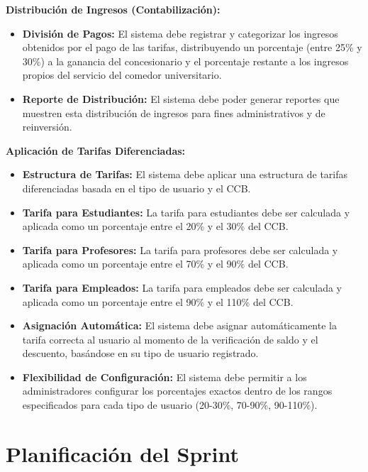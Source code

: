 \documentclass[12pt]{article}
\begin{document}
\textbf{Distribución de Ingresos (Contabilización):}

\begin{itemize}
	\item \textbf{División de Pagos:} El sistema debe registrar y categorizar los ingresos obtenidos por el pago de las tarifas, distribuyendo un porcentaje (entre 25\% y 30\%) a la ganancia del concesionario y el porcentaje restante a los ingresos propios del servicio del comedor universitario.
	\item \textbf{Reporte de Distribución:} El sistema debe poder generar reportes que muestren esta distribución de ingresos para fines administrativos y de reinversión.
\end{itemize}

\pagebreak

\textbf{Aplicación de Tarifas Diferenciadas:}

\begin{itemize}
	\item \textbf{Estructura de Tarifas:} El sistema debe aplicar una estructura de tarifas diferenciadas basada en el tipo de usuario y el CCB.
	\item \textbf{Tarifa para Estudiantes:} La tarifa para estudiantes debe ser calculada y aplicada como un porcentaje entre el 20\% y el 30\% del CCB.
	\item \textbf{Tarifa para Profesores:} La tarifa para profesores debe ser calculada y aplicada como un porcentaje entre el 70\% y el 90\% del CCB.
	\item \textbf{Tarifa para Empleados:} La tarifa para empleados debe ser calculada y aplicada como un porcentaje entre el 90\% y el 110\% del CCB.
	\item \textbf{Asignación Automática:} El sistema debe asignar automáticamente la tarifa correcta al usuario al momento de la verificación de saldo y el descuento, basándose en su tipo de usuario registrado.
	\item \textbf{Flexibilidad de Configuración:} El sistema debe permitir a los administradores configurar los porcentajes exactos dentro de los rangos especificados para cada tipo de usuario (20-30\%, 70-90\%, 90-110\%).
\end{itemize}

\pagebreak

\section{Planificación del Sprint}
\end{document}
